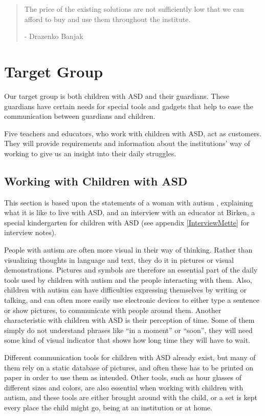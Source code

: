 \begin{quotation}
The price of the existing solutions are not sufficiently low that we can afford to buy and use them throughout the institute.\\ 
	\begin{flushright}
		- Drazenko Banjak
	\end{flushright}
\end{quotation}\section{Target Group}
Our target group is both children with ASD and their guardians. These guardians have certain needs for special tools and gadgets that help to ease the communication between guardians and children.

Five teachers and educators, who work with children with ASD, act as customers. They will provide requirements and information about the institutions' way of working to give us an insight into their daily struggles.

\subsection{Working with Children with ASD}
This section is based upon the statements of a woman with autism \cite{autism.com}, explaining what it is like to live with ASD, and an interview with an educator at Birken, a special kindergarten for children with ASD (see appendix \ref{InterviewMette} for interview notes).

	People with autism are often more visual in their way of thinking. Rather than visualizing thoughts in language and text, they do it in pictures or visual demonstrations. Pictures and symbols are therefore an essential part of the daily tools used by children with autism and the people interacting with them. Also, children with autism can have difficulties expressing themselves by writing or talking, and can often more easily use electronic devices to either type a sentence or show pictures, to communicate with people around them.
	Another characteristic with children with ASD is their perception of time. Some of them simply do not understand phrases like "`in a moment"' or "`soon"', they will need some kind of visual indicator that shows how long time they will have to wait.

Different communication tools for children with ASD already exist, but many of them rely on a static database of pictures, and often these has to be printed on paper in order to use them as intended. Other tools, such as hour glasses of different sizes and colors, are also essential when working with children with autism, and these tools are either brought around with the child, or a set is kept every place the child might go, being at an institution or at home.

